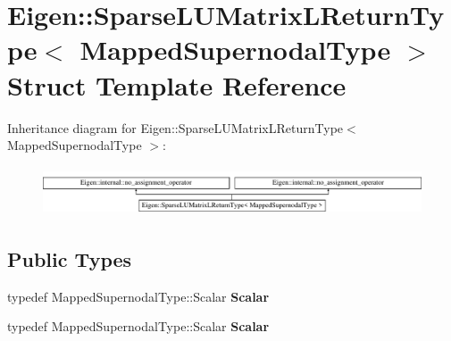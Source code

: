 \hypertarget{struct_eigen_1_1_sparse_l_u_matrix_l_return_type}{}\section{Eigen\+:\+:Sparse\+L\+U\+Matrix\+L\+Return\+Type$<$ Mapped\+Supernodal\+Type $>$ Struct Template Reference}
\label{struct_eigen_1_1_sparse_l_u_matrix_l_return_type}
Inheritance diagram for Eigen\+:\+:Sparse\+L\+U\+Matrix\+L\+Return\+Type$<$ Mapped\+Supernodal\+Type $>$\+:\begin{figure}[H]
\begin{center}
\leavevmode
\includegraphics[height=1.462141cm]{struct_eigen_1_1_sparse_l_u_matrix_l_return_type}
\end{center}
\end{figure}
\subsection*{Public Types}
\begin{DoxyCompactItemize}
\item 
\mbox{\label{struct_eigen_1_1_sparse_l_u_matrix_l_return_type_ae59407bc58d3ffc58a7557dbac649048}} 
typedef Mapped\+Supernodal\+Type\+::\+Scalar {\bfseries Scalar}
\item 
\mbox{\label{struct_eigen_1_1_sparse_l_u_matrix_l_return_type_ae59407bc58d3ffc58a7557dbac649048}} 
typedef Mapped\+Supernodal\+Type\+::\+Scalar {\bfseries Scalar}
\end{DoxyCompactItemize}
